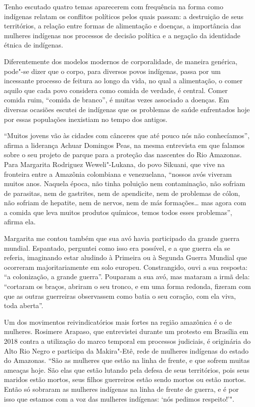 \asterisc

Tenho escutado quatro temas aparecerem com frequência na forma como indígenas relatam os
conflitos políticos pelos quais passam: a destruição de seus territórios, a relação entre formas de alimentação e doenças, a importância das mulheres indígenas
nos processos de decisão política e a negação da identidade étnica de
indígenas.

Diferentemente dos modelos modernos de corporalidade, de maneira
genérica, pode"-se dizer que o corpo, para diversos povos indígenas, passa por um
incessante processo de feitura ao longo da vida, no qual a alimentação,
o comer aquilo que cada povo considera como comida de verdade, é
central. Comer comida ruim, ``comida de branco'', é muitas vezes associado a
doenças. Em diversas ocasiões escutei de indígenas que os problemas de
saúde enfrentados hoje por essas populações inexistiam no tempo dos
antigos.

``Muitos jovens vão às cidades com cânceres que até pouco nós não
conhecíamos'', afirma a liderança Achuar Domingos Peas, na mesma
entrevista em que falamos sobre o seu projeto de parque para a proteção
das nascentes do Rio Amazonas. Para Margarita Rodriguez Weweli"-Lukana, do
povo Sikuani, que vive na fronteira entre a Amazônia colombiana e
venezuelana, ``nossos avós viveram muitos anos. Naquela época, não tinha
poluição nem contaminação, não sofriam de parasitas, nem de gastrites,
nem de apendicite, nem de problemas de cólon, não sofriam de hepatite,
nem de nervos, nem de más formações\ldots{} mas agora com a comida que
leva muitos produtos químicos, temos todos esses problemas'', afirma
ela.

Margarita me contou também que sua avó havia participado da grande
guerra mundial. Espantado, perguntei como isso era possível, e a que
guerra ela se referia, imaginando estar aludindo à Primeira ou à Segunda
Guerra Mundial que ocorreram majoritariamente em solo europeu.
Constrangido, ouvi a sua resposta: ``a colonização, a grande guerra''.
Pouparam a sua avó, mas mataram a irmã dela: ``cortaram os braços,
abriram o seu tronco, e em uma forma redonda, fizeram com que as outras
guerreiras observassem como batia o seu coração, com ela viva, toda
aberta''.

Um dos movimentos reivindicatórios mais fortes na região amazônica é o
de mulheres. Rosimere Arapaso, que entrevistei durante um
protesto em Brasília em 2018 contra a utilização do marco temporal em
processos judiciais, é originária do Alto Rio Negro e participa da
Makira"-Etê, rede de mulheres indígenas do estado do Amazonas. ``São as
mulheres que estão na linha de frente, e que sofrem muitas ameaças hoje.
São elas que estão lutando pela defesa de seus territórios, pois seus
maridos estão mortos, seus filhos guerreiros estão sendo mortos ou estão
mortos. Então só sobraram as mulheres indígenas na linha de frente de
guerra, e é por isso que estamos com a voz das mulheres indígenas: `nós
pedimos respeito!'".

